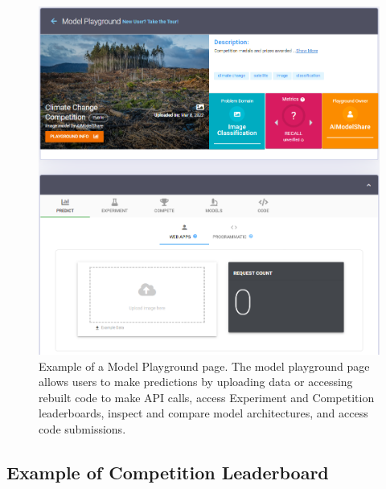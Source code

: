 \begin{figure}[h!]
  \centering
  \includegraphics[width=1\textwidth]{figures/playground.png}
  \caption{Example of a Model Playground page. The model playground page allows users to make predictions by uploading data or accessing rebuilt code to make API calls, access Experiment and Competition leaderboards, inspect and compare model architectures, and access code submissions.}
\end{figure}

\newpage
\subsection{Example of Competition Leaderboard}
\label{app:competition}

